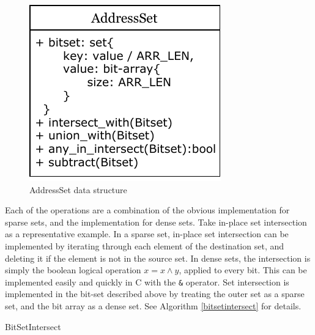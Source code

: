 \documentclass[12pt,twoside]{reedthesis}
\begin{document}
			\begin{figure}[H]
				\caption{AddressSet data structure}
				\label{fig:bitset}
				\includegraphics[scale=1.0]{bit_data.pdf}
			\end{figure}
				
			
			
			
			Each of the operations are a combination of the obvious implementation for sparse sets, and the implementation for dense sets. Take in-place set intersection as a representative example. In a sparse set, in-place set intersection can be implemented by iterating through each element of the destination set, and deleting it if the element is not in the source set. In dense sets, the intersection is simply the boolean logical operation $x = x \land y$, applied to every bit. This can be implemented easily and quickly in C with the \texttt{\&} operator. Set intersection is implemented in the bit-set described above by treating the outer set as a sparse set, and the bit array as a dense set. See Algorithm \ref{bitsetintersect} for details. %
			
			\begin{algorithm}
				\caption{BitSetIntersect}
				\label{bitsetintersect}
				\begin{algorithmic}[1]
					
					
					\Else
					\EndIf
					\EndFor
					
					\EndFunction
				\end{algorithmic}
			\end{algorithm}
		
\end{document}
